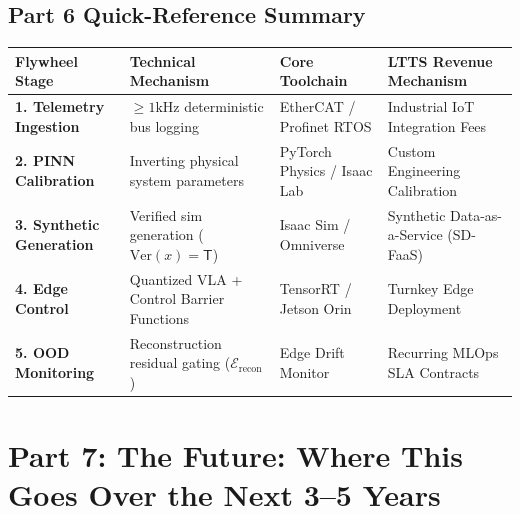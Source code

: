 \documentclass[11pt,a4paper]{article}
\begin{document}
\subsection*{Part 6 Quick-Reference Summary}
\begin{table}[h!]
\centering
\scriptsize
\begin{tabularx}{\textwidth}{@{}l p{4.2cm} p{3.2cm} X@{}}
\toprule
\textbf{Flywheel Stage} & \textbf{Technical Mechanism} & \textbf{Core Toolchain} & \textbf{LTTS Revenue Mechanism} \\
\midrule
\textbf{1. Telemetry Ingestion} & $\ge 1\text{kHz}$ deterministic bus logging & EtherCAT / Profinet RTOS & Industrial IoT Integration Fees \\
\textbf{2. PINN Calibration} & Inverting physical system parameters & PyTorch Physics / Isaac Lab & Custom Engineering Calibration \\
\textbf{3. Synthetic Generation} & Verified sim generation ($\text{Ver}(x) = \mathsf{T}$) & Isaac Sim / Omniverse & Synthetic Data-as-a-Service (SD-FaaS) \\
\textbf{4. Edge Control} & Quantized VLA + Control Barrier Functions & TensorRT / Jetson Orin & Turnkey Edge Deployment \\
\textbf{5. OOD Monitoring} & Reconstruction residual gating ($\mathcal{E}_{\text{recon}}$) & Edge Drift Monitor & Recurring MLOps SLA Contracts \\
\bottomrule
\end{tabularx}
\end{table}

\section{Part 7: The Future: Where This Goes Over the Next 3--5 Years}
\end{document}
